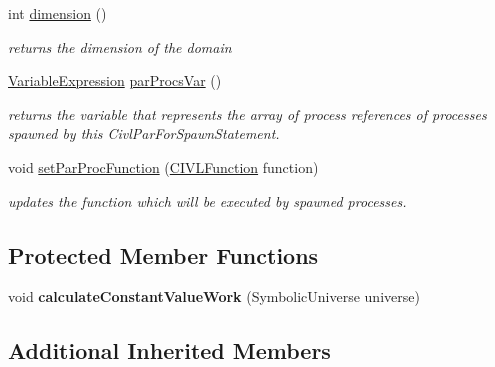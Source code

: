 \begin{DoxyCompactItemize}
\item 
int \hyperlink{classedu_1_1udel_1_1cis_1_1vsl_1_1civl_1_1model_1_1common_1_1statement_1_1CommonCivlParForSpawnStatement_a0aec25e3929a912fc22d143ab2eca49b}{dimension} ()
\begin{DoxyCompactList}\small\item\em returns the dimension of the domain \end{DoxyCompactList}\item 
\hyperlink{interfaceedu_1_1udel_1_1cis_1_1vsl_1_1civl_1_1model_1_1IF_1_1expression_1_1VariableExpression}{Variable\+Expression} \hyperlink{classedu_1_1udel_1_1cis_1_1vsl_1_1civl_1_1model_1_1common_1_1statement_1_1CommonCivlParForSpawnStatement_acc070eebcf4169815fcf4dcc36df8d7a}{par\+Procs\+Var} ()
\begin{DoxyCompactList}\small\item\em returns the variable that represents the array of process references of processes spawned by this Civl\+Par\+For\+Spawn\+Statement. \end{DoxyCompactList}\item 
void \hyperlink{classedu_1_1udel_1_1cis_1_1vsl_1_1civl_1_1model_1_1common_1_1statement_1_1CommonCivlParForSpawnStatement_a3246155bdbfe19d639cc32426fd2025d}{set\+Par\+Proc\+Function} (\hyperlink{interfaceedu_1_1udel_1_1cis_1_1vsl_1_1civl_1_1model_1_1IF_1_1CIVLFunction}{C\+I\+V\+L\+Function} function)
\begin{DoxyCompactList}\small\item\em updates the function which will be executed by spawned processes. \end{DoxyCompactList}\end{DoxyCompactItemize}
\subsection*{Protected Member Functions}
\begin{DoxyCompactItemize}
\item 
\hypertarget{classedu_1_1udel_1_1cis_1_1vsl_1_1civl_1_1model_1_1common_1_1statement_1_1CommonCivlParForSpawnStatement_a7236fc3d430670bc801809ecfa0535a0}{}void {\bfseries calculate\+Constant\+Value\+Work} (Symbolic\+Universe universe)\label{classedu_1_1udel_1_1cis_1_1vsl_1_1civl_1_1model_1_1common_1_1statement_1_1CommonCivlParForSpawnStatement_a7236fc3d430670bc801809ecfa0535a0}

\end{DoxyCompactItemize}
\subsection*{Additional Inherited Members}



